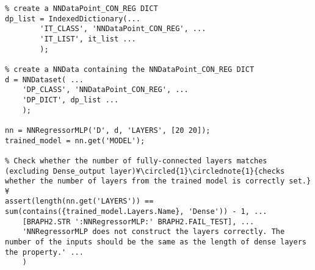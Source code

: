 \documentclass{tufte-handout}
\begin{document}
\begin{lstlisting}
% create a NNDataPoint_CON_REG DICT
dp_list = IndexedDictionary(...
        'IT_CLASS', 'NNDataPoint_CON_REG', ...
        'IT_LIST', it_list ...
        );

% create a NNData containing the NNDataPoint_CON_REG DICT
d = NNDataset( ...
    'DP_CLASS', 'NNDataPoint_CON_REG', ...
    'DP_DICT', dp_list ...
    );

nn = NNRegressorMLP('D', d, 'LAYERS', [20 20]);
trained_model = nn.get('MODEL');

% Check whether the number of fully-connected layers matches (excluding Dense_output layer)¥\circled{1}\circlednote{1}{checks whether the number of layers from the trained model is correctly set.}¥
assert(length(nn.get('LAYERS')) == sum(contains({trained_model.Layers.Name}, 'Dense')) - 1, ...
    [BRAPH2.STR ':NNRegressorMLP:' BRAPH2.FAIL_TEST], ...
    'NNRegressorMLP does not construct the layers correctly. The number of the inputs should be the same as the length of dense layers the property.' ...
    )

\end{lstlisting}

%
%
\end{document}

